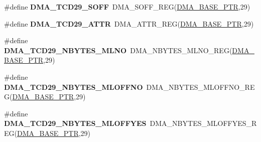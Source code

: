 \begin{DoxyCompactItemize}
\item 
\hypertarget{group___d_m_a___register___accessor___macros_ga93235221428221088fb6f94a8cc4b7df}{}\#define {\bfseries D\+M\+A\+\_\+\+T\+C\+D29\+\_\+\+S\+O\+F\+F}~D\+M\+A\+\_\+\+S\+O\+F\+F\+\_\+\+R\+E\+G(\hyperlink{group___d_m_a___peripheral_ga6997fbc1b1973e9f27170217a3bd6f22}{D\+M\+A\+\_\+\+B\+A\+S\+E\+\_\+\+P\+T\+R},29)\label{group___d_m_a___register___accessor___macros_ga93235221428221088fb6f94a8cc4b7df}

\item 
\hypertarget{group___d_m_a___register___accessor___macros_gaaefdc70579c52a75fafa76da6e2c8485}{}\#define {\bfseries D\+M\+A\+\_\+\+T\+C\+D29\+\_\+\+A\+T\+T\+R}~D\+M\+A\+\_\+\+A\+T\+T\+R\+\_\+\+R\+E\+G(\hyperlink{group___d_m_a___peripheral_ga6997fbc1b1973e9f27170217a3bd6f22}{D\+M\+A\+\_\+\+B\+A\+S\+E\+\_\+\+P\+T\+R},29)\label{group___d_m_a___register___accessor___macros_gaaefdc70579c52a75fafa76da6e2c8485}

\item 
\hypertarget{group___d_m_a___register___accessor___macros_ga737bb49f602f7594aab1cbef03b5a89e}{}\#define {\bfseries D\+M\+A\+\_\+\+T\+C\+D29\+\_\+\+N\+B\+Y\+T\+E\+S\+\_\+\+M\+L\+N\+O}~D\+M\+A\+\_\+\+N\+B\+Y\+T\+E\+S\+\_\+\+M\+L\+N\+O\+\_\+\+R\+E\+G(\hyperlink{group___d_m_a___peripheral_ga6997fbc1b1973e9f27170217a3bd6f22}{D\+M\+A\+\_\+\+B\+A\+S\+E\+\_\+\+P\+T\+R},29)\label{group___d_m_a___register___accessor___macros_ga737bb49f602f7594aab1cbef03b5a89e}

\item 
\hypertarget{group___d_m_a___register___accessor___macros_ga88fcab931be11e8f267501ac1b0b1e3d}{}\#define {\bfseries D\+M\+A\+\_\+\+T\+C\+D29\+\_\+\+N\+B\+Y\+T\+E\+S\+\_\+\+M\+L\+O\+F\+F\+N\+O}~D\+M\+A\+\_\+\+N\+B\+Y\+T\+E\+S\+\_\+\+M\+L\+O\+F\+F\+N\+O\+\_\+\+R\+E\+G(\hyperlink{group___d_m_a___peripheral_ga6997fbc1b1973e9f27170217a3bd6f22}{D\+M\+A\+\_\+\+B\+A\+S\+E\+\_\+\+P\+T\+R},29)\label{group___d_m_a___register___accessor___macros_ga88fcab931be11e8f267501ac1b0b1e3d}

\item 
\hypertarget{group___d_m_a___register___accessor___macros_ga0bfa98f53d585f9bae15117925a6bbd7}{}\#define {\bfseries D\+M\+A\+\_\+\+T\+C\+D29\+\_\+\+N\+B\+Y\+T\+E\+S\+\_\+\+M\+L\+O\+F\+F\+Y\+E\+S}~D\+M\+A\+\_\+\+N\+B\+Y\+T\+E\+S\+\_\+\+M\+L\+O\+F\+F\+Y\+E\+S\+\_\+\+R\+E\+G(\hyperlink{group___d_m_a___peripheral_ga6997fbc1b1973e9f27170217a3bd6f22}{D\+M\+A\+\_\+\+B\+A\+S\+E\+\_\+\+P\+T\+R},29)\label{group___d_m_a___register___accessor___macros_ga0bfa98f53d585f9bae15117925a6bbd7}


\end{DoxyCompactItemize}
